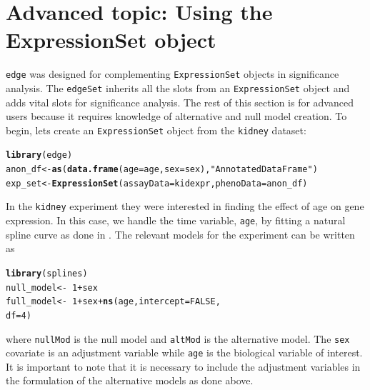 \documentclass{article}\usepackage[]{graphicx}\usepackage[]{color}
\makeatletter
\newcommand{\hlnum}[1]{\textcolor[rgb]{0.686,0.059,0.569}{#1}}%
\newcommand{\hlstr}[1]{\textcolor[rgb]{0.192,0.494,0.8}{#1}}%
\newcommand{\hlopt}[1]{\textcolor[rgb]{0,0,0}{#1}}%
\newcommand{\hlstd}[1]{\textcolor[rgb]{0.345,0.345,0.345}{#1}}%
\newcommand{\hlkwb}[1]{\textcolor[rgb]{0.69,0.353,0.396}{#1}}%
\newcommand{\hlkwc}[1]{\textcolor[rgb]{0.333,0.667,0.333}{#1}}%
\newcommand{\hlkwd}[1]{\textcolor[rgb]{0.737,0.353,0.396}{\textbf{#1}}}%
\newenvironment{kframe}{%
 \def\at@end@of@kframe{}%
 \ifinner\ifhmode%
  \def\at@end@of@kframe{\end{minipage}}%
  \begin{minipage}{\columnwidth}%
 \fi\fi%
 \def\FrameCommand##1{\hskip\@totalleftmargin \hskip-\fboxsep
 \colorbox{shadecolor}{##1}\hskip-\fboxsep
     \hskip-\linewidth \hskip-\@totalleftmargin \hskip\columnwidth}%
 \MakeFramed {\advance\hsize-\width
   \@totalleftmargin\z@ \linewidth\hsize
   \@setminipage}}%
 {\par\unskip\endMakeFramed%
 \at@end@of@kframe}
\newenvironment{knitrout}{}{} %
\makeatother
\begin{document}
\section{Advanced topic: Using the ExpressionSet object}
\label{sec:advanced}
{\tt edge} was designed for complementing {\tt ExpressionSet} objects in significance analysis. The {\tt edgeSet} inherits all the slots from an {\tt ExpressionSet} object and adds vital slots for significance analysis. The rest of this section is for advanced users because it requires knowledge of alternative and null model creation. To begin, lets create an {\tt ExpressionSet} object from the {\tt kidney} dataset:
\begin{knitrout}
\color{fgcolor}\begin{kframe}
\begin{alltt}
\hlkwd{library}\hlstd{(edge)}
\hlstd{anon_df} \hlkwb{<-} \hlkwd{as}\hlstd{(}\hlkwd{data.frame}\hlstd{(}\hlkwc{age}\hlstd{=age,} \hlkwc{sex}\hlstd{=sex),} \hlstr{"AnnotatedDataFrame"}\hlstd{)}
\hlstd{exp_set} \hlkwb{<-} \hlkwd{ExpressionSet}\hlstd{(}\hlkwc{assayData} \hlstd{= kidexpr,} \hlkwc{phenoData} \hlstd{= anon_df)}
\end{alltt}
\end{kframe}
\end{knitrout}

In the {\tt kidney} experiment they were interested in finding the effect of age on gene expression. In this case, we handle the time variable, {\tt age}, by fitting a natural spline curve as done in \cite{storey:2005}. The relevant models for the experiment can be written as
\begin{knitrout}
\color{fgcolor}\begin{kframe}
\begin{alltt}
\hlkwd{library}\hlstd{(splines)}
\hlstd{null_model} \hlkwb{<-} \hlopt{~}\hlnum{1} \hlopt{+} \hlstd{sex}
\hlstd{full_model} \hlkwb{<-} \hlopt{~}\hlnum{1} \hlopt{+} \hlstd{sex} \hlopt{+} \hlkwd{ns}\hlstd{(age,} \hlkwc{intercept} \hlstd{=} \hlnum{FALSE}\hlstd{,}
    \hlkwc{df} \hlstd{=} \hlnum{4}\hlstd{)}
\end{alltt}
\end{kframe}
\end{knitrout}

where {\tt nullMod} is the null model and {\tt altMod} is the alternative model. The {\tt sex} covariate is an adjustment variable while {\tt age} is the biological variable of interest. It is important to note that it is necessary to include the adjustment variables in the formulation of the alternative models as done above.
\end{document}
